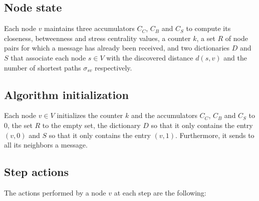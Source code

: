 \subsection{Node state}

Each node $v$ maintains three accumulators $C_C$, $C_B$ and $C_S$ to compute its closeness, betweenness and stress centrality values, a counter $k$, a set $R$ of node pairs for which a \mrep{} message has already been received, and two dictionaries $D$ and $S$ that associate each node $s \in V$ with the discovered distance $d(s,v)$ and the number of shortest paths $\sigma_{sv}$ respectively.

\subsection{Algorithm initialization}

Each node $v \in V$ initializes the counter $k$ and the accumulators $C_C$, $C_B$ and $C_S$ to $0$, the set $R$ to the empty set, the dictionary $D$ so that it only contains the entry $(v,0)$ and $S$ so that it only contains the entry $(v,1)$. Furthermore, it sends to all its neighbors a  message.

\subsection{Step actions}
\label{deccen:step}

The actions performed by a node $v$ at each step are the following:

